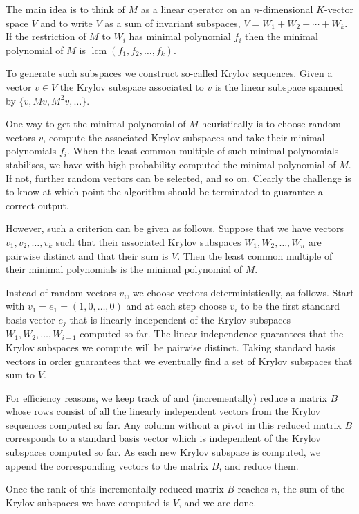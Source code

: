 \documentclass{sig-alternate-05-2015}
\DeclareMathOperator{\lcm}{lcm}
\begin{document}
The main idea is to think of $M$ as a linear operator on an $n$-dimensional
$K$-vector space $V$ and to write $V$ as a sum of invariant subspaces, 
$V = W_1 + W_2 + \cdots + W_k$. If the restriction of $M$ to $W_i$ has
minimal polynomial $f_i$ then the minimal polynomial of $M$ is
$\lcm(f_1, f_2, \ldots, f_k)$.

To generate such subspaces we construct so-called Krylov sequences. Given
a vector $v \in V$ the Krylov subspace associated to $v$ is the linear
subspace spanned by $\{v, Mv, M^2v, \ldots\}$.

One way to get the minimal polynomial of $M$ heuristically is to choose
random vectors $v$, compute the associated Krylov subspaces and take their
minimal polynomials $f_i$. When the least common multiple of such minimal
polynomials stabilises, we have with high probability computed the minimal
polynomial of $M$. If not, further random vectors can be selected, and so
on. Clearly the challenge is to know at which point the algorithm should
be terminated to guarantee a correct output.

However, such a criterion can be given as follows. Suppose that
we have vectors $v_1, v_2, \ldots, v_k$ such that their associated Krylov
subspaces $W_1, W_2, \ldots, W_n$ are pairwise distinct and that their
sum is $V$. Then the least common multiple of their minimal polynomials is
the minimal polynomial of $M$.

Instead of random vectors $v_i$, we choose vectors deterministically,
as follows. Start with $v_1 = e_1 = (1, 0, \ldots, 0)$ and at each
step choose $v_i$ to be the first standard basis vector $e_j$ that is
linearly independent of the Krylov subspaces $W_1, W_2, \ldots, W_{i-1}$
computed so far. The linear independence guarantees that the Krylov
subspaces we compute will be pairwise distinct. Taking standard basis
vectors in order guarantees that we eventually find a set of Krylov
subspaces that sum to $V$.

For efficiency reasons, we keep track of and (incrementally) reduce
a matrix $B$ whose rows consist of all the linearly independent
vectors from the Krylov sequences computed so far. Any column without
a pivot in this reduced matrix $B$ corresponds to a standard basis
vector which is independent of the Krylov subspaces computed so far.
As each new Krylov subspace is computed, we append the corresponding
vectors to the matrix $B$, and reduce them.

Once the rank of this incrementally reduced matrix $B$ reaches $n$, the
sum of the Krylov subspaces we have computed is $V$, and we are done.
\end{document}

